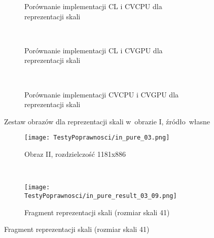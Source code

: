 \begin{itemize}
\begin{figure}[H]
\begin{subfigure}[t]{0.3\textwidth}
	\centering
	\setlength\fboxsep{0pt}
	\setlength\fboxrule{0.5pt}
	\caption{Porównanie implementacji CL i CVCPU dla reprezentacji skali}
	\label{fig:valPure2CLCVCPU}
\end{subfigure}
~
\begin{subfigure}[t]{0.3\textwidth}
	\centering
	\setlength\fboxsep{0pt}
	\setlength\fboxrule{0.5pt}
	\caption{Porównanie implementacji CL i CVGPU dla reprezentacji skali}
	\label{fig:valPure2CLCVGPU}
\end{subfigure}
~
\begin{subfigure}[t]{0.3\textwidth}
	\centering
	\setlength\fboxsep{0pt}
	\setlength\fboxrule{0.5pt}
	\caption{Porównanie implementacji CVCPU i CVGPU dla reprezentacji skali}
	\label{fig:valPure2CVCPUCVGPU}                 
\end{subfigure}
\caption{Zestaw obrazów dla reprezentacji skali w~obrazie I, \tiny{źródło~własne}}

\label{fig:valPure2}
\end{figure}

\begin{figure}[H]
\begin{center}
\begin{subfigure}[t]{0.3\textwidth}
\texttt{[image: TestyPoprawnosci/in\_pure\_03.png]}
\caption{Obraz II, rozdzielczość 1181x886}
\label{fig:valPure03}
\end{subfigure}
~
\begin{subfigure}[t]{0.3\textwidth}
\texttt{[image: TestyPoprawnosci/in\_pure\_result\_03\_09.png]}
\caption{Fragment reprezentacji skali (rozmiar skali 41)}
\label{fig:valPure03}
\end{subfigure}
\end{center}


\end{figure}
\end{itemize}
